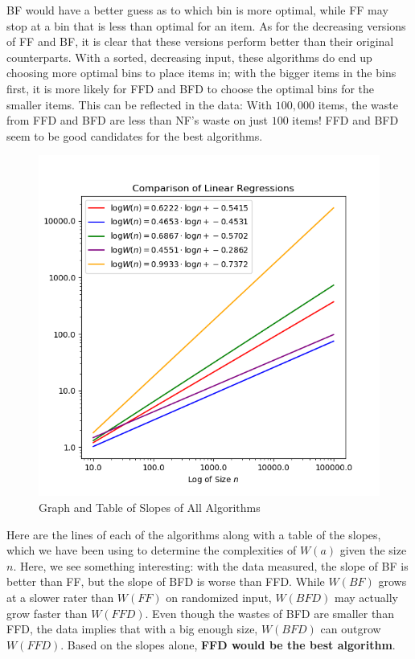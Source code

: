 \documentclass{article}
\begin{document}
    BF would have a better guess as to which bin is more optimal, while FF may
    stop at a bin that is less than optimal for an item.
    \nextblurb
    As for the decreasing versions of FF and BF, it is clear that these versions 
    perform better than their original counterparts. With a sorted, decreasing 
    input, these algorithms do end up choosing more optimal bins to place items 
    in; with the bigger items in the bins first, it is more likely for FFD and 
    BFD to choose the optimal bins for the smaller items. This can be reflected 
    in the data: With $100,000$ items, the waste from FFD and BFD are less than 
    NF's waste on just $100$ items! FFD and BFD seem to be good candidates for 
    the best algorithms.
    \begin{figure}[H]
        \centering
        \includegraphics[scale=0.60]{"../images/all-lines"}
        \caption{Graph and Table of Slopes of All Algorithms}
    \end{figure}
    \noindent Here are the lines of each of the algorithms along with a table
    of the slopes, which we have been using to determine the complexities of
    $W(a)$ given the size $n$.  Here, we see something interesting: with the
    data measured, the slope of BF is better than FF, but the slope of BFD is 
    worse than FFD. While $W(BF)$ grows at a slower rater than $W(FF)$ on 
    randomized input, $W(BFD)$ may actually grow faster than $W(FFD)$. Even 
    though the wastes of BFD are smaller than FFD, the data implies that with a 
    big enough size, $W(BFD)$ can outgrow $W(FFD)$. Based on the slopes alone, 
    \textbf{FFD would be the best algorithm}.
\end{document}
